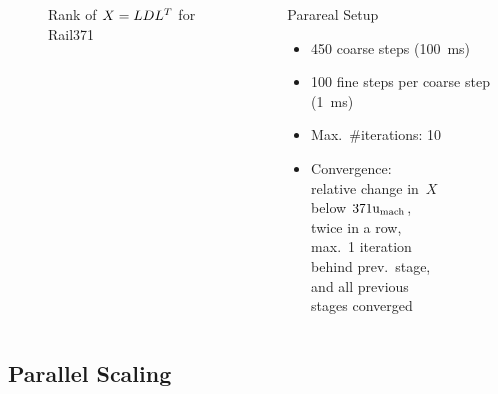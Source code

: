 \begin{frame}{\secname}
\begin{columns}[onlytextwidth]
\begin{minipage}[b][0.75\textwidth][c]{\textwidth}
{\begin{figure}
  \caption{Rank of $X=LDL^T$ for Rail371}
  \end{figure}
}
  \end{minipage}
  \begin{block}{Parareal Setup}
    \begin{itemize}
      \item
        450 coarse steps (\SI{100}{\milli\second})
      \item
        100 fine steps per coarse step (\SI{1}{\milli\second})
      \item
        Max.~\#iterations: 10
      \item
        Convergence:\\
        relative change in~$X$\\ below $371\mathrm u_\text{mach}$,\\
        twice in a row,\\
        max.~1 iteration\\
        behind prev.~stage,\\
        and all previous\\
        stages converged
    \end{itemize}
  \end{block}
  \end{columns}
\end{frame}

\subsection{Parallel Scaling}

